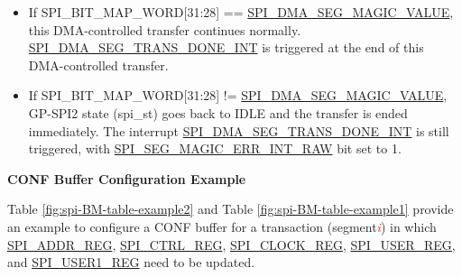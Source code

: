 \documentclass[main\_\_EN.tex]{subfiles}
\begin{document}
    \begin{itemize}
        \item If SPI\_BIT\_MAP\_WORD[31:28] == \hyperref[fielddesc:SPIDMASEGMAGICVALUE]{SPI\_DMA\_SEG\_MAGIC\_VALUE}, this DMA-controlled transfer continues normally. \hyperref[int:SPIDMASEGTRANSDONEINT]{SPI\_DMA\_SEG\_TRANS\_DONE\_INT} is triggered at the end of this DMA-controlled transfer.
        \item If SPI\_BIT\_MAP\_WORD[31:28] != \hyperref[fielddesc:SPIDMASEGMAGICVALUE]{SPI\_DMA\_SEG\_MAGIC\_VALUE}, GP-SPI2 state (spi\_st) goes back to IDLE and the transfer is ended immediately. The interrupt \hyperref[int:SPIDMASEGTRANSDONEINT]{SPI\_DMA\_SEG\_TRANS\_DONE\_INT} is still triggered, with \hyperref[fielddesc:SPISEGMAGICERRINTRAW]{SPI\_SEG\_MAGIC\_ERR\_INT\_RAW} bit set to 1.
    \end{itemize}

\textbf{CONF Buffer Configuration Example}\label{sec:gp-spi2-sct-conf-buffer}

Table \ref{fig:spi-BM-table-example2} and Table \ref{fig:spi-BM-table-example1} provide an example to configure a CONF buffer for a transaction (segment\textcolor{red}{\it i}) in which \hyperref[regdesc:SPIADDRREG]{SPI\_ADDR\_REG}, \hyperref[regdesc:SPICTRLREG]{SPI\_CTRL\_REG}, \hyperref[regdesc:SPICLOCKREG]{SPI\_CLOCK\_REG}, \hyperref[regdesc:SPIUSERREG]{SPI\_USER\_REG}, and \hyperref[regdesc:SPIUSER1REG]{SPI\_USER1\_REG} need to be updated.
\end{document}
